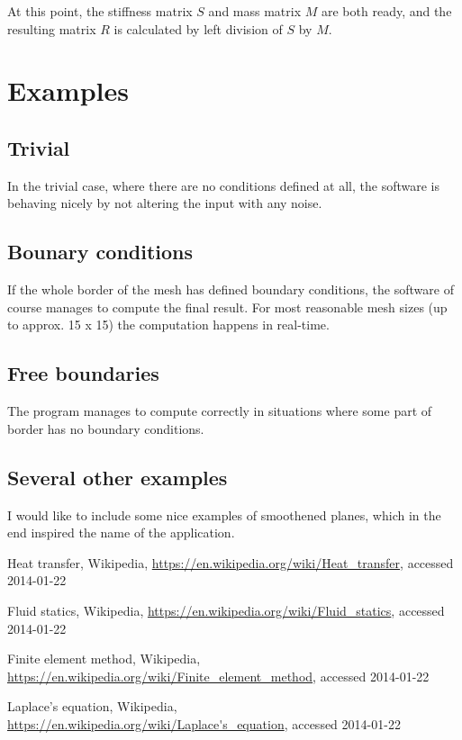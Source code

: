 \documentclass[a4paper,12pt]{article}
\begin{document}
At this point, the stiffness matrix $S$ and mass matrix $M$ are both ready, and the resulting matrix $R$ is calculated
by left division of $S$ by $M$.

\section{Examples}

\subsection{Trivial}

In the trivial case, where there are no conditions defined at all, the software is behaving nicely by not altering the
input with any noise.

\subsection{Bounary conditions}

If the whole border of the mesh has defined boundary conditions, the software of course manages to compute the final
result. For most reasonable mesh sizes (up to approx. 15 x 15) the computation happens in real-time.

\subsection{Free boundaries}

The program manages to compute correctly in situations where some part of border has no boundary conditions.

\subsection{Several other examples}

I would like to include some nice examples of smoothened planes, which in the end inspired the name of the application. 

\begin{thebibliography}{9}

  Heat transfer,
  Wikipedia,
  \url{https://en.wikipedia.org/wiki/Heat_transfer},
  accessed 2014-01-22

  Fluid statics,
  Wikipedia,
  \url{https://en.wikipedia.org/wiki/Fluid_statics},
  accessed 2014-01-22

  Finite element method,
  Wikipedia,
  \url{https://en.wikipedia.org/wiki/Finite_element_method},
  accessed 2014-01-22

  Laplace's equation,
  Wikipedia,
  \url{https://en.wikipedia.org/wiki/Laplace's_equation},
  accessed 2014-01-22


\end{thebibliography}
\end{document}
